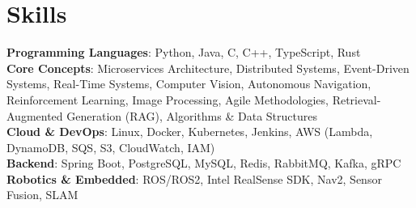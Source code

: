 \section{Skills}
\begin{itemize}[leftmargin=0.15in, label={}]
	\small{\item{
		      \textbf{Programming Languages}{: Python, Java, C, C++, TypeScript, Rust} \\
		      \textbf{Core Concepts}{: Microservices Architecture, Distributed Systems, Event-Driven Systems, Real-Time Systems, Computer Vision, Autonomous Navigation, Reinforcement Learning, Image Processing, Agile Methodologies, Retrieval-Augmented Generation (RAG), Algorithms \& Data Structures} \\
		      \textbf{Cloud \& DevOps}{: Linux, Docker, Kubernetes, Jenkins, AWS (Lambda, DynamoDB, SQS, S3, CloudWatch, IAM)} \\
		      \textbf{Backend}{: Spring Boot, PostgreSQL, MySQL, Redis, RabbitMQ, Kafka, gRPC} \\
		      \textbf{Robotics \& Embedded}{: ROS/ROS2, Intel RealSense SDK, Nav2, Sensor Fusion, SLAM}
	      }}
\end{itemize}